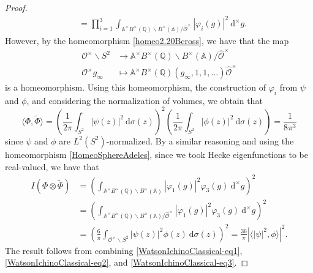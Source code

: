 \documentclass[11pt]{amsart}
\theoremstyle{definition}
\begin{document}
\begin{proof}
\begin{align*}
    &= \prod_{i=1}^{3} \int_{\mathbb{A}^{\times} B^{\times}(\mathbb{Q}) \backslash B^{\times}(\mathbb{A}) / \widehat{\mathcal{O}}^{\times}} |\varphi_{i}(g)|^2 \: \mathrm{d}^{\times}g.
\end{align*}
However, by the homeomorphism \eqref{homeo2.20Bcross}, we have that the map
\begin{align}
    \mathcal{O}^{\times} \backslash S^2 &\longrightarrow \mathbb{A}^{\times} B^{\times}(\mathbb{Q}) \backslash B^{\times}(\mathbb{A}) / \widehat{\mathcal{O}}^{\times} \label{HomeoSphereAdeles} \\
    \mathcal{O}^{\times} g_{\infty} &\longmapsto \mathbb{A}^{\times} B^{\times}(\mathbb{Q}) (g_{\infty},1,1,\dots) \widehat{\mathcal{O}}^{\times} \nonumber
\end{align}
is a homeomorphism. Using this homeomorphism, the construction of $\varphi_i$ from $\psi$ and $\phi$, and considering the normalization of volumes, we obtain that 
\begin{equation}
    \langle \Phi, \widetilde{\Phi} \rangle = \left( \frac{1}{2\pi} \int_{S^2} |\psi(z)|^{2} \: \mathrm{d}\sigma(z) \right)^2 \left( \frac{1}{2\pi} \int_{S^2} |\phi(z)|^{2} \: \mathrm{d}\sigma(z) \right) = \frac{1}{8\pi^3} \label{WatsonIchinoClassical-eq2}
\end{equation}
since $\psi$ and $\phi$ are $L^2(S^2)$-normalized. By a similar reasoning and using the homeomorphism \eqref{HomeoSphereAdeles}, since we took Hecke eigenfunctions to be real-valued, we have that 
\begin{align}
    I(\Phi \otimes \widetilde{\Phi}) &= \left( \int_{\mathbb{A}^{\times} B^{\times}(\mathbb{Q}) \backslash B^{\times}(\mathbb{A})} |\varphi_1(g)|^2 \varphi_3(g) \: \mathrm{d}^{\times}g \right)^2 \label{WatsonIchinoClassical-eq3} \\
    &= \left( \int_{\mathbb{A}^{\times} B^{\times}(\mathbb{Q}) \backslash B^{\times}(\mathbb{A}) / \widehat{\mathcal{O}}^{\times}} |\varphi_1(g)|^2 \varphi_3(g) \: \mathrm{d}^{\times}g \right)^2 \nonumber \\
    &= \left( \frac{6}{\pi} \int_{\mathcal{O}^{\times} \backslash S^2} |\psi(z)|^2 \phi(z) \: \mathrm{d}\sigma(z) \right)^2 = \frac{36}{\pi} \left|\langle |\psi|^2, \phi \rangle \right|^2. \nonumber
\end{align}
The result follows from combining \eqref{WatsonIchinoClassical-eq1}, \eqref{WatsonIchinoClassical-eq2}, and \eqref{WatsonIchinoClassical-eq3}.
\end{proof}
\end{document}
